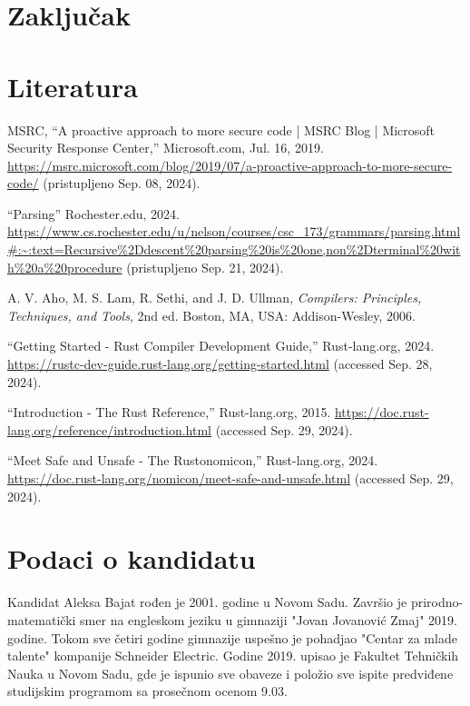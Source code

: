 \documentclass[11pt]{article}
\begin{document}
\newpage
\section{Zaključak}

\newpage
\section{Literatura}

\begin{thebibliography}
    \raggedright
{} 
    MSRC, “A proactive approach to more secure code | MSRC Blog | 
    Microsoft Security Response Center,” Microsoft.com, Jul. 16, 2019. 
    \url{https://msrc.microsoft.com/blog/2019/07/a-proactive-approach-to-more-secure-code/} 
    (pristupljeno Sep. 08, 2024).

    “Parsing” Rochester.edu, 2024.
    \url{https://www.cs.rochester.edu/u/nelson/courses/csc_173/grammars/parsing.html#:~:text=Recursive%2Ddescent%20parsing%20is%20one,non%2Dterminal%20with%20a%20procedure} 
    (pristupljeno Sep. 21, 2024).

    A. V. Aho, M. S. Lam, R. Sethi, and J. D. Ullman, \emph{Compilers: Principles, Techniques, and Tools}, 2nd ed. Boston, MA, USA: Addison-Wesley, 2006.

    “Getting Started - Rust Compiler Development Guide,” Rust-lang.org, 2024. 
    \url{https://rustc-dev-guide.rust-lang.org/getting-started.html} (accessed Sep. 28, 2024).

    “Introduction - The Rust Reference,” Rust-lang.org, 2015. 
    \url{https://doc.rust-lang.org/reference/introduction.html} (accessed Sep. 29, 2024).
    
    “Meet Safe and Unsafe - The Rustonomicon,” Rust-lang.org, 2024. 
    \url{https://doc.rust-lang.org/nomicon/meet-safe-and-unsafe.html} (accessed Sep. 29, 2024).
\end{thebibliography}

\newpage
\section{Podaci o kandidatu}


Kandidat Aleksa Bajat rođen je 2001. godine u Novom Sadu. Završio je prirodno-matematički smer na engleskom jeziku 
u gimnaziji "Jovan Jovanović Zmaj" 2019. godine. Tokom sve četiri godine gimnazije uspešno je pohadjao 
"Centar za mlade talente" kompanije Schneider Electric.  Godine 2019. upisao je Fakultet 
Tehničkih Nauka u Novom Sadu, gde je ispunio sve obaveze i položio sve ispite predviđene 
studijskim programom sa prosečnom ocenom 9.03.
\end{document}
